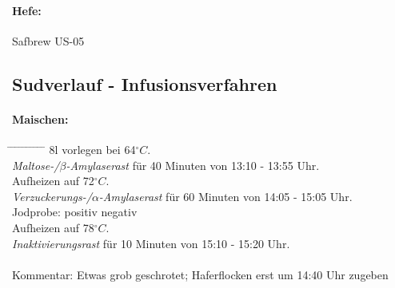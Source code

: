 \documentclass[12pt,oneside,a4paper]{scrartcl}
\begin{document}
\paragraph{Hefe:}
	Safbrew US-05
{\onehalfspacing
%
\subsection*{Sudverlauf - Infusionsverfahren}	
%
\paragraph{Maischen:}
	\begin{tabbing}\hspace{1cm} \=
		\hspace{1cm} \= \hspace{1cm} \=\hspace{1cm} \=\hspace{1cm} \=\hspace{1cm} \= \hspace{1cm} \= \hspace{1cm} \= \hspace{1cm} \= \hspace{1cm} \= \kill
		\> 8l vorlegen bei 64$^\circ C$.\\
		\> \textit{Maltose-/$\beta$-Amylaserast} für 40 Minuten von 13:10 - 13:55 Uhr.\\
		\> \> Aufheizen auf 72$^\circ C$.\\
		\> \textit{Verzuckerungs-/$\alpha$-Amylaserast} für 60 Minuten von 14:05 - 15:05 Uhr.\\
		\> \> \> Jodprobe: \> \> \Square positiv \> \> \CheckedBox negativ\\
		\> \> Aufheizen auf 78$^\circ C$.\\
		\> \textit{Inaktivierungsrast} für 10 Minuten von 15:10 - 15:20 Uhr.\\\\
		\> Kommentar: \>\>\> Etwas grob geschrotet; Haferflocken erst um 14:40 Uhr zugeben
	\end{tabbing}
%
}
\end{document}
